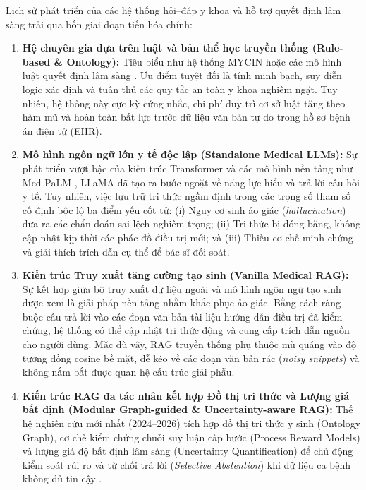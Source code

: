 Lịch sử phát triển của các hệ thống hỏi--đáp y khoa và hỗ trợ quyết định lâm sàng trải qua bốn giai đoạn tiến hóa chính:
\begin{enumerate}[label=(\arabic*)]
    \item \textbf{Hệ chuyên gia dựa trên luật và bản thể học truyền thống (Rule-based \& Ontology):} Tiêu biểu như hệ thống MYCIN hoặc các mô hình luật quyết định lâm sàng \cite{rule_based_1, rule_based_2}. Ưu điểm tuyệt đối là tính minh bạch, suy diễn logic xác định và tuân thủ các quy tắc an toàn y khoa nghiêm ngặt. Tuy nhiên, hệ thống này cực kỳ cứng nhắc, chi phí duy trì cơ sở luật tăng theo hàm mũ và hoàn toàn bất lực trước dữ liệu văn bản tự do trong hồ sơ bệnh án điện tử (EHR).
    \item \textbf{Mô hình ngôn ngữ lớn y tế độc lập (Standalone Medical LLMs):} Sự phát triển vượt bậc của kiến trúc Transformer \cite{vaswani2017} và các mô hình nền tảng như Med-PaLM \cite{singhal2023towards}, LLaMA \cite{llama3_2024} đã tạo ra bước ngoặt về năng lực hiểu và trả lời câu hỏi y tế. Tuy nhiên, việc lưu trữ tri thức ngầm định trong các trọng số tham số cố định bộc lộ ba điểm yếu cốt tử: (i) Nguy cơ sinh ảo giác (\emph{hallucination}) đưa ra các chẩn đoán sai lệch nghiêm trọng; (ii) Tri thức bị đóng băng, không cập nhật kịp thời các phác đồ điều trị mới; và (iii) Thiếu cơ chế minh chứng và giải thích trích dẫn cụ thể để bác sĩ đối soát.
    \item \textbf{Kiến trúc Truy xuất tăng cường tạo sinh (Vanilla Medical RAG):} Sự kết hợp giữa bộ truy xuất dữ liệu ngoài và mô hình ngôn ngữ tạo sinh \cite{lewis2020, karpukhin2020} được xem là giải pháp nền tảng nhằm khắc phục ảo giác. Bằng cách ràng buộc câu trả lời vào các đoạn văn bản tài liệu hướng dẫn điều trị đã kiểm chứng, hệ thống có thể cập nhật tri thức động và cung cấp trích dẫn nguồn cho người dùng. Mặc dù vậy, RAG truyền thống phụ thuộc mù quáng vào độ tương đồng cosine bề mặt, dễ kéo về các đoạn văn bản rác (\emph{noisy snippets}) và không nắm bắt được quan hệ cấu trúc giải phẫu.
    \item \textbf{Kiến trúc RAG đa tác nhân kết hợp Đồ thị tri thức và Lượng giá bất định (Modular Graph-guided \& Uncertainty-aware RAG):} Thế hệ nghiên cứu mới nhất (2024--2026) tích hợp đồ thị tri thức y sinh (Ontology Graph), cơ chế kiểm chứng chuỗi suy luận cấp bước (Process Reward Models) và lượng giá độ bất định lâm sàng (Uncertainty Quantification) để chủ động kiểm soát rủi ro và từ chối trả lời (\emph{Selective Abstention}) khi dữ liệu ca bệnh không đủ tin cậy \cite{knowing_when_abstain_2026, knowguard2024, dong2025discuss}.
\end{enumerate}

